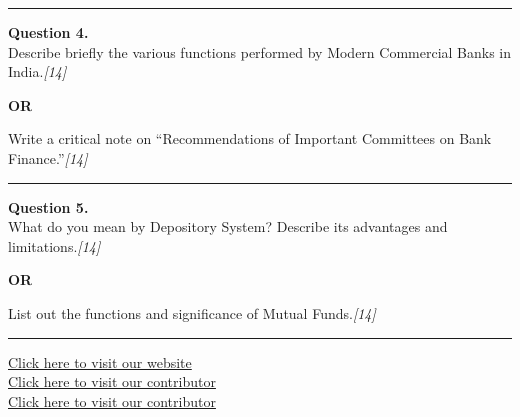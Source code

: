 \documentclass[11pt,a4paper]{article}
\newcommand{\pts}[1]{\hfill   \textit{[#1]}}
\begin{document}
\medskip\rule{\linewidth}{0.2pt}




\noindent   \textbf{Question 4.} \\
Describe briefly the various functions performed by Modern Commercial Banks in India.\pts{14}

\centerline{   \textbf{OR}}

Write a critical note on ``Recommendations of Important Committees on Bank Finance.''\pts{14}

\medskip\rule{\linewidth}{0.2pt}




\noindent   \textbf{Question 5.} \\
What do you mean by Depository System? Describe its advantages and limitations.\pts{14}

\centerline{   \textbf{OR}}

List out the functions and significance of Mutual Funds.\pts{14}

\vfill
\rule{\linewidth}{0.4pt}

\begin{center}\small
\href{https://bhu-exam.vercel.app/}{Click here to visit our website}\\[4pt]
\href{https://me-aryan.vercel.app/}{Click here to visit our contributor}\\[4pt]
\href{https://quashan-me.vercel.app/}{Click here to visit our contributor}
\end{center}
\end{document}
